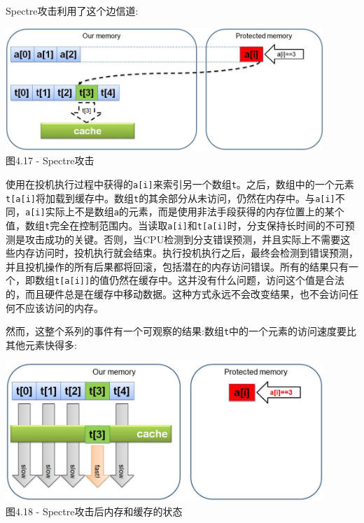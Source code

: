 Spectre攻击利用了这个边信道:

\begin{center}
\includegraphics[width=0.9\textwidth]{content/1/chapter4/images/17.jpg}\\
图4.17 - Spectre攻击
\end{center}

使用在投机执行过程中获得的\texttt{a[i]}来索引另一个数组\texttt{t}。之后，数组中的一个元素\texttt{t[a[i]}将加载到缓存中。数组\texttt{t}的其余部分从未访问，仍然在内存中。与\texttt{a[i]}不同，\texttt{a[i]}实际上不是数组\texttt{a}的元素，而是使用非法手段获得的内存位置上的某个值，数组\texttt{t}完全在控制范围内。当读取\texttt{a[i]}和\texttt{t[a[i]}时，分支保持长时间的不可预测是攻击成功的关键。否则，当CPU检测到分支错误预测，并且实际上不需要这些内存访问时，投机执行就会结束。执行投机执行之后，最终会检测到错误预测，并且投机操作的所有后果都将回滚，包括潜在的内存访问错误。所有的结果只有一个，即数组\texttt{t[a[i]]}的值仍然在缓存中。这并没有什么问题，访问这个值是合法的，而且硬件总是在缓存中移动数据。这种方式永远不会改变结果，也不会访问任何不应该访问的内存。

然而，这整个系列的事件有一个可观察的结果:数组\texttt{t}中的一个元素的访问速度要比其他元素快得多:

\begin{center}
\includegraphics[width=0.9\textwidth]{content/1/chapter4/images/18.jpg}\\
图4.18 - Spectre攻击后内存和缓存的状态
\end{center}

